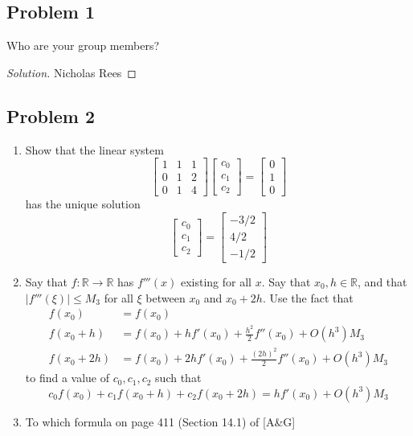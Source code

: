 \documentclass{article}
\newcommand{\R}{{\mathbb R}}
\begin{document}
\subsection*{Problem 1}
Who are your group members?
\begin{proof}[Solution]\let\qed\relax
	Nicholas Rees
\end{proof}

\subsection*{Problem 2}
\begin{enumerate}
	\item Show that the linear system
		\[
			\begin{bmatrix}
				1 & 1 & 1\\
				0 & 1 & 2\\
				0 & 1 & 4
			\end{bmatrix}
			\begin{bmatrix} c_0 \\ c_1 \\ c_2 \end{bmatrix}
			= \begin{bmatrix} 0 \\ 1 \\ 0 \end{bmatrix}
		\]
		has the unique solution
		\[
			\begin{bmatrix} c_0 \\ c_1 \\ c_2 \end{bmatrix}
			= \begin{bmatrix} -3/2 \\ 4/2 \\ -1/2 \end{bmatrix}
		\]
	\item Say that $f \colon \R \to \R$ has $f'''(x)$ existing for all $x$.
		Say that $x_0,h \in \R$, and that $\lvert f'''(\xi)\rvert \leq M_3$
		for all $\xi$ between $x_0$ and $x_0 + 2h$.
		Use the fact that
		\begin{align*}
			f(x_0) &= f(x_0)\\
			f(x_0+h) &= f(x_0) + hf'(x_0) + \frac{h^2}{2}f''(x_0) + O(h^3)M_3\\
			f(x_0+2h) &= f(x_0) + 2hf'(x_0) + \frac{(2h)^2}{2}f''(x_0) + O(h^3)M_3
		\end{align*}
		to find a value of $c_0,c_1,c_2$ such that
		\[
			c_0f(x_0) + c_1f(x_0 + h) + c_2f(x_0 + 2h)
			= hf'(x_0) + O(h^3)M_3
		\]
	\item To which formula on page 411 (Section 14.1) of [A\&G]

\end{enumerate}
\end{document}
